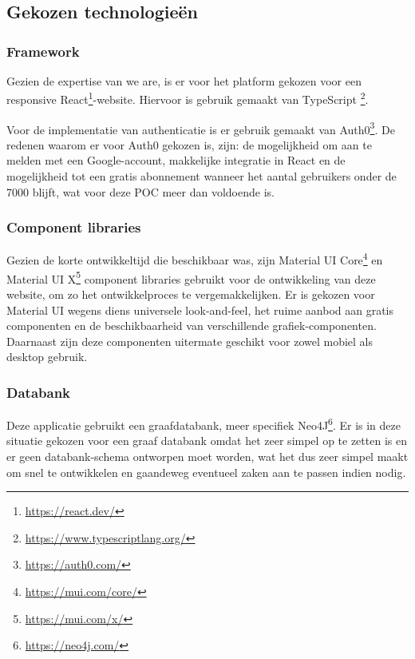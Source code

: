 \chapter{}%
\label{ch:proofofconcept}

\section{Gekozen technologieën}

\subsection{Framework}

Gezien de expertise van we are, is er voor het platform gekozen voor een responsive React\footnote{\href{https://react.dev/}{https://react.dev/}}-website. Hiervoor is gebruik gemaakt van TypeScript \footnote{\href{https://www.typescriptlang.org/}{https://www.typescriptlang.org/}}.

Voor de implementatie van authenticatie is er gebruik gemaakt van Auth0\footnote{\href{https://auth0.com/}{https://auth0.com/}}. De redenen waarom er voor Auth0 gekozen is, zijn: de mogelijkheid om aan te melden met een Google-account, makkelijke integratie in React en de mogelijkheid tot een gratis abonnement wanneer het aantal gebruikers onder de 7000 blijft, wat voor deze POC meer dan voldoende is.

\subsection{Component libraries}
Gezien de korte ontwikkeltijd die beschikbaar was, zijn Material UI Core\footnote{\href{https://mui.com/core/}{https://mui.com/core/}} en Material UI X\footnote{\href{https://mui.com/x/}{https://mui.com/x/}} component libraries gebruikt voor de ontwikkeling van deze website, om zo het ontwikkelproces te vergemakkelijken. Er is gekozen voor Material UI wegens diens universele look-and-feel, het ruime aanbod aan gratis componenten en de beschikbaarheid van verschillende grafiek-componenten. Daarnaast zijn deze componenten uitermate geschikt voor zowel mobiel als desktop gebruik.

\subsection{Databank}

Deze applicatie gebruikt een graafdatabank, meer specifiek Neo4J\footnote{\href{https://neo4j.com/}{https://neo4j.com/}}. Er is in deze situatie gekozen voor een graaf databank omdat het zeer simpel op te zetten is en er geen databank-schema ontworpen moet worden, wat het dus zeer simpel maakt om snel te ontwikkelen en gaandeweg eventueel zaken aan te passen indien nodig.

